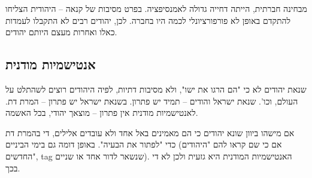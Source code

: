 \documentclass[]{article}
\begin{document}
	מבחינה חברתית, הייתה דחייה גדולה לאמנסיפציה. בפרט מסיבות של קנאה – היהודית הצליחו להתקדם באופן לא פורפורציונלי לכמה היו בחברה. לכן, יהודים רבים לא התקבלו לעמדות כאלו ואחרות מעצם היותם יהודים. 
	
	\subsection{אנטישמיות מודנית}
	שנאת יהודים לא כי "הם הרגו את ישו", ולא מסיבות דתיות, לפיה היהודים רוצים לשהתלט על העולם, וכו'. שנאת ישראל והודים – תמיד יש פתרון. בשנאת ישראל יש פתרון – המרת דת. לאנטישמיות מודנית אין פתרון – מוצאך יהודי, בכל האשמה. 
	
	אם מישהו ביוון שונא יהודים כי הם מאמינים באל אחד ולא עובדים אלילים, די בהמרת דת כדי "לפתור את הבעיה". באופן דומה גם בימי הביניים (אם כי שם קראו להם "היהודים החדשים", tag שנשאר לדור אחד או שניים). האנטישמיות המודנית היא גזעית ולכן לא די בכך. 
	
\end{document}
